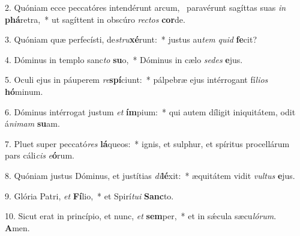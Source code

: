 2. Quóniam ecce peccatóres intendérunt arcum, \dag\  paravérunt sagíttas suas \textit{in} \textbf{phá}retra,~*  ut sagíttent in obscúro \textit{rec}\textit{tos} \textbf{cor}de.\

3. Quóniam quæ perfecísti, de\textit{stru}\textbf{xé}runt:~*  justus au\textit{tem} \textit{quid} \textbf{fe}cit?\

4. Dóminus in templo sanc\textit{to} \textbf{su}o,~*  Dóminus in cælo \textit{se}\textit{des} \textbf{e}jus.\

5. Oculi ejus in páuperem \textit{re}\textbf{spí}ciunt:~*  pálpebræ ejus intérrogant fí\textit{li}\textit{os} \textbf{hó}minum.\

6. Dóminus intérrogat justum \textit{et} \textbf{ím}pium:~*  qui autem díligit iniquitátem, odit á\textit{ni}\textit{mam} \textbf{su}am.\

7. Pluet super peccató\textit{res} \textbf{lá}queos:~*  ignis, et sulphur, et spíritus procellárum pars cáli\textit{cis} \textit{e}\textbf{ó}rum.\

8. Quóniam justus Dóminus, et justítias \textit{di}\textbf{lé}xit:~*  æquitátem vidit \textit{vul}\textit{tus} \textbf{e}jus.\

9. Glória Patri, \textit{et} \textbf{Fí}lio,~*  et Spirí\textit{tu}\textit{i} \textbf{Sanc}to.\

10. Sicut erat in princípio, et nunc, \textit{et} \textbf{sem}per,~*  et in sǽcula sæcu\textit{ló}\textit{rum}. \textbf{A}men.\


